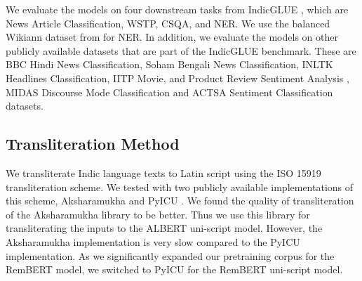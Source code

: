 \documentclass[11pt]{article}
\begin{document}
We evaluate the models on four downstream tasks from IndicGLUE \citep{kakwani-etal-2020-indicnlpsuite}, which are News Article Classification, WSTP, CSQA, and NER. We use the balanced Wikiann dataset from \citet{rahimi-etal-2019-massively} for NER. In addition, we evaluate the models on other publicly available datasets that are part of the IndicGLUE benchmark. These are BBC Hindi News Classification, Soham Bengali News Classification, INLTK Headlines Classification, IITP Movie, and Product Review Sentiment Analysis \citep{cicling/Akhtar16}, MIDAS Discourse Mode Classification \citep{Dhanwal2020AnAD} and ACTSA Sentiment Classification \citep{mukku-mamidi-2017-actsa} datasets.
\subsection{Transliteration Method}
\label{transliteration-method}
We transliterate Indic language texts to Latin script using the ISO 15919 transliteration scheme. We tested with two publicly available implementations of this scheme, Aksharamukha  \citep{Aksharamukha} and PyICU \citep{pyicu}. We found the quality of transliteration of the Aksharamukha library to be better. Thus we use this library for transliterating the inputs to the ALBERT uni-script model. However, the Aksharamukha implementation is very slow compared to the PyICU implementation. As we significantly expanded our pretraining corpus for the RemBERT model, we switched to PyICU for the RemBERT uni-script model.
\end{document}
